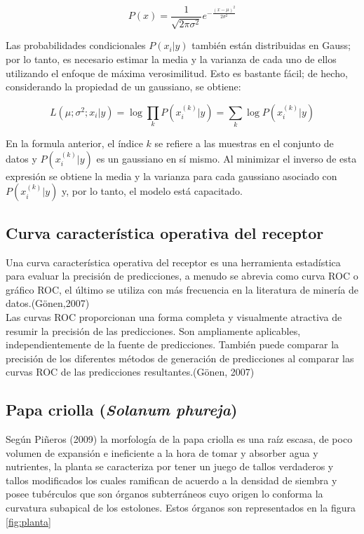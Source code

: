 \[
P\left(x\right) = \frac{1}{\sqrt{2\pi\sigma^{2}}}e^{-\frac{\left(x-\mu\right)^{2}}{2\sigma^{2}}}
\]

Las probabilidades condicionales $P\left(x_{i} | y\right)$ también están distribuidas en Gauss; por lo tanto, es necesario estimar la media y la varianza de cada uno de ellos utilizando el enfoque de máxima verosimilitud. Esto es bastante fácil; de hecho, considerando la propiedad de un gaussiano, se obtiene:

\[
L\left(\mu;\sigma^{2};x_{i} | y\right)=\log\prod_{k}P\left(x_{i}^{\left(k\right)}|y\right)=\sum_{k}\log P\left(x_{i}^{\left(k\right)}|y\right)
\]

En la formula anterior, el índice $k$ se refiere a las muestras en el conjunto de datos y $P\left(x_{i}^{\left(k\right)}|y\right)$ es un gaussiano en sí mismo. Al minimizar el inverso de esta expresión se obtiene la media y la varianza para cada gaussiano asociado con $P\left(x_{i}^{\left(k\right)}|y\right)$ y, por lo tanto, el modelo está capacitado.

\subsection{Curva característica operativa del receptor}

Una curva característica operativa del receptor es una herramienta estadística para evaluar la precisión de predicciones, a menudo se abrevia como curva ROC o gráfico ROC, el último se utiliza con más frecuencia en la literatura de minería de datos.(Gönen,2007)\\

Las curvas ROC proporcionan una forma completa y visualmente atractiva de resumir la precisión de las predicciones. Son ampliamente aplicables, independientemente de la fuente de predicciones. También puede comparar la precisión de los diferentes métodos de generación de predicciones al comparar las curvas ROC de las predicciones resultantes.(Gönen, 2007)

\subsection{Papa criolla (\textit{Solanum phureja})}

Según Piñeros (2009) la morfología de la papa criolla es una raíz escasa, de poco volumen de expansión e ineficiente a la hora de tomar y absorber agua y nutrientes, la planta se caracteriza por tener un juego de tallos verdaderos y tallos modificados los cuales ramifican de acuerdo a la densidad de siembra y  posee tubérculos que son órganos subterráneos cuyo origen lo conforma la curvatura subapical de los estolones. Estos órganos son representados en la figura \ref{fig:planta}\\


